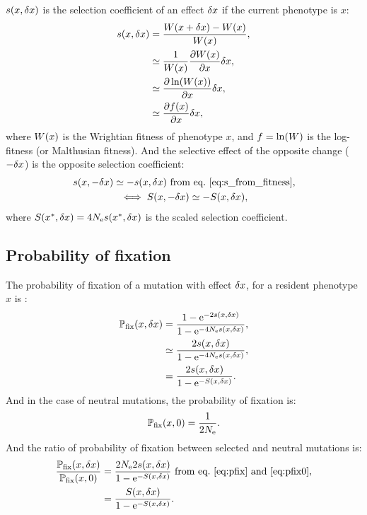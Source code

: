 $s(x, \delta x)$ is the selection coefficient of an effect $\delta x$ if the current phenotype is $x$:
\begin{align}
    s(x, \delta x) &= \frac{ W (x + \delta x) - W (x)}{ W ( x)}, \\
    &\simeq \frac{1}{ W (x)}\frac{ \partial W (x) }{\partial x} \delta x, \\
    &\simeq \frac{ \partial \ln (W (x))}{\partial x} \delta x, \\
    &\simeq \frac{ \partial f (x) }{\partial x} \delta x, \label{eq:s_from_fitness}
\end{align}
where $ W ( x)$ is the Wrightian fitness of phenotype $x$, and $ f  = \ln (W)$ is the log-fitness (or Malthusian fitness).
And the selective effect of the opposite change ($-\delta x$) is the opposite selection coefficient:
\begin{gather}
    s(x, -\delta x) \simeq - s(x, \delta x) \text{ from eq.~\ref{eq:s_from_fitness}} \label{eq:s_minus_deltax}, \\
    \iff S(x, -\delta x) \simeq - S(x, \delta x), \label{eq:S_minus_deltax}
\end{gather}
where $S(x^{*}, \delta x) = 4N_{\text{e}} s (x^{*}, \delta x)$ is the scaled selection coefficient.

\subsection{Probability of fixation}
\label{subsec:probability-of-fixation}

The probability of fixation of a mutation with effect $\delta x$, for a resident phenotype $x$ is :
\begin{align}
    \mathbb{P}_{\text{fix}}(x, \delta x) &= \frac{ 1 - \text{e}^{-2 s(x, \delta x)}}{1 - \text{e}^{-4N_{\text{e}} s(x, \delta x)}}, \\
    &\simeq \frac{ 2 s(x, \delta x)}{1 - \text{e}^{-4N_{\text{e}} s(x, \delta x)}}, \\
    &= \frac{ 2 s(x, \delta x)}{1 - \text{e}^{-S(x, \delta x)}}. \label{eq:pfix}
\end{align}
And in the case of neutral mutations, the probability of fixation is:
\begin{gather}
    \mathbb{P}_{\text{fix}}(x, 0) = \frac{ 1}{2 N_{\text{e}}} \label{eq:pfix0}.
\end{gather}
And the ratio of probability of fixation between selected and neutral mutations is:
\begin{align}
    \frac{\mathbb{P}_{\text{fix}}(x, \delta x)}{\mathbb{P}_{\text{fix}}(x, 0)} & = \frac{ 2 N_{\text{e}} 2 s(x, \delta x)}{1 - \text{e}^{-S(x, \delta x)}} \text{ from eq.~\ref{eq:pfix} and~\ref{eq:pfix0}},\\
    & = \frac{S(x, \delta x)}{1 - \text{e}^{-S(x, \delta x)}} \label{eq:pfixratio}.
\end{align}

